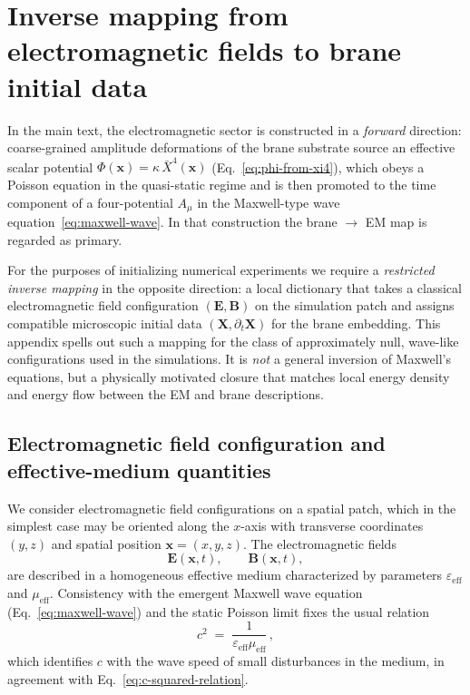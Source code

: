 \section{Inverse mapping from electromagnetic fields to brane initial data}
\label{app:inverse-em-mapping}

In the main text, the electromagnetic sector is constructed in a
\emph{forward} direction: coarse-grained amplitude deformations of the
brane substrate source an effective scalar potential
$\Phi(\mathbf x) = \kappa\,\bar X^4(\mathbf x)$
(Eq.~\eqref{eq:phi-from-xi4}), which obeys a Poisson equation in the
quasi-static regime and is then promoted to the time component of a
four-potential $A_\mu$ in the Maxwell-type wave
equation~\eqref{eq:maxwell-wave}. In that construction the brane $\to$
EM map is regarded as primary.

For the purposes of initializing numerical experiments we require a
\emph{restricted inverse mapping} in the opposite direction: a local
dictionary that takes a classical electromagnetic field configuration
$(\mathbf E,\mathbf B)$ on the simulation patch and assigns compatible
microscopic initial data $(\mathbf X,\partial_t\mathbf X)$ for the
brane embedding. This appendix spells out such a mapping for the class
of approximately null, wave-like configurations used in the simulations.
It is \emph{not} a general inversion of Maxwell's equations, but a
physically motivated closure that matches local energy density and
energy flow between the EM and brane descriptions.

\subsection{Electromagnetic field configuration and effective-medium quantities}

We consider electromagnetic field configurations on a spatial patch,
which in the simplest case may be oriented along the $x$-axis with
transverse coordinates $(y,z)$ and spatial position
$\mathbf x = (x,y,z)$. The electromagnetic fields
\begin{equation}
  \mathbf E(\mathbf x,t), \qquad \mathbf B(\mathbf x,t),
\end{equation}
are described in a homogeneous effective medium characterized by
parameters $\varepsilon_{\mathrm{eff}}$ and $\mu_{\mathrm{eff}}$.
Consistency with the emergent Maxwell wave equation
(Eq.~\eqref{eq:maxwell-wave}) and the static Poisson limit fixes the
usual relation
\begin{equation}
  c^2
  \;=\;
  \frac{1}{\varepsilon_{\mathrm{eff}}\mu_{\mathrm{eff}}}\,,
  \label{eq:app-c2}
\end{equation}
which identifies $c$ with the wave speed of small disturbances in the
medium, in agreement with Eq.~\eqref{eq:c-squared-relation}.

